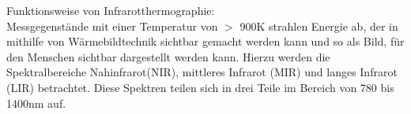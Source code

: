Funktionsweise von Infrarotthermographie: \\ Messgegenstände mit einer
Temperatur von $>$ 900K strahlen Energie ab, der in mithilfe von
Wärmebildtechnik sichtbar gemacht werden kann und so als Bild, für den Menschen
sichtbar dargestellt werden kann. Hierzu werden die Spektralbereiche
Nahinfrarot(NIR), mittleres Infrarot (MIR) und langes Infrarot (LIR)
betrachtet. Diese Spektren teilen sich in drei Teile im Bereich von 780 bis
1400nm auf.\cite{schuster2004infrarotthermographie}

